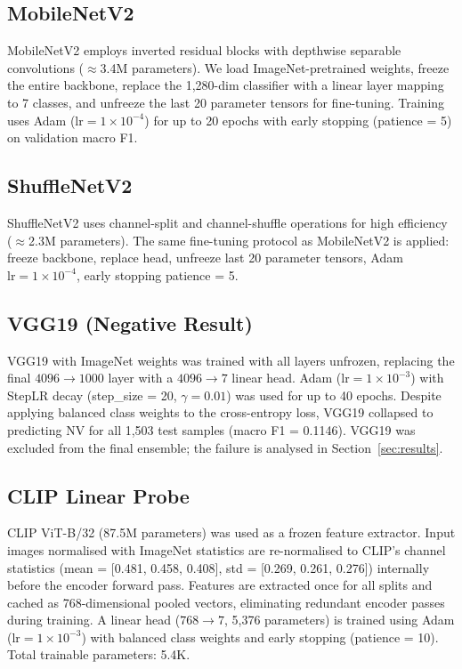 \documentclass[conference]{IEEEtran}
\begin{document}
\subsection{MobileNetV2}
MobileNetV2 \cite{sandler2018} employs inverted residual blocks with
depthwise separable convolutions ($\approx$3.4M parameters). We load
ImageNet-pretrained weights, freeze the entire backbone, replace the
1,280-dim classifier with a linear layer mapping to 7 classes, and
unfreeze the last 20 parameter tensors for fine-tuning. Training uses
Adam ($\text{lr}=1{\times}10^{-4}$) for up to 20 epochs with early
stopping (patience = 5) on validation macro F1.

\subsection{ShuffleNetV2}
ShuffleNetV2 \cite{ma2018} uses channel-split and channel-shuffle
operations for high efficiency ($\approx$2.3M parameters). The same
fine-tuning protocol as MobileNetV2 is applied: freeze backbone,
replace head, unfreeze last 20 parameter tensors, Adam
$\text{lr}=1{\times}10^{-4}$, early stopping patience = 5.

\subsection{VGG19 (Negative Result)}
VGG19 \cite{simonyan2015} with ImageNet weights was trained with all
layers unfrozen, replacing the final $4096{\to}1000$ layer with a
$4096{\to}7$ linear head. Adam ($\text{lr}=1{\times}10^{-3}$) with
StepLR decay (step\_size = 20, $\gamma=0.01$) was used for up to 40
epochs. Despite applying balanced class weights to the cross-entropy
loss, VGG19 collapsed to predicting NV for all 1,503 test samples
(macro F1 = 0.1146). VGG19 was excluded from the final ensemble; the
failure is analysed in Section~\ref{sec:results}.

\subsection{CLIP Linear Probe}
CLIP \cite{radford2021} ViT-B/32 (87.5M parameters) was used as a
frozen feature extractor. Input images normalised with ImageNet
statistics are re-normalised to CLIP's channel statistics
(mean = [0.481, 0.458, 0.408], std = [0.269, 0.261, 0.276])
internally before the encoder forward pass. Features are extracted
once for all splits and cached as 768-dimensional pooled vectors,
eliminating redundant encoder passes during training. A linear head
($768{\to}7$, 5,376 parameters) is trained using Adam
($\text{lr}=1{\times}10^{-3}$) with balanced class weights and early
stopping (patience = 10). Total trainable parameters: 5.4K.
\end{document}
